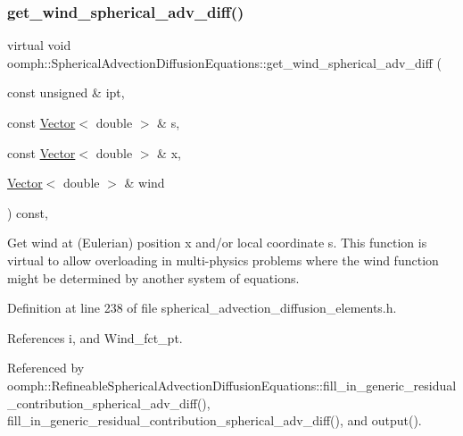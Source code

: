 \subsubsection{\texorpdfstring{get\+\_\+wind\+\_\+spherical\+\_\+adv\+\_\+diff()}{get\_wind\_spherical\_adv\_diff()}}
{\footnotesize\ttfamily virtual void oomph\+::\+Spherical\+Advection\+Diffusion\+Equations\+::get\+\_\+wind\+\_\+spherical\+\_\+adv\+\_\+diff (\begin{DoxyParamCaption}\item[{const unsigned \&}]{ipt,  }\item[{const \hyperlink{classoomph_1_1Vector}{Vector}$<$ double $>$ \&}]{s,  }\item[{const \hyperlink{classoomph_1_1Vector}{Vector}$<$ double $>$ \&}]{x,  }\item[{\hyperlink{classoomph_1_1Vector}{Vector}$<$ double $>$ \&}]{wind }\end{DoxyParamCaption}) const\hspace{0.3cm}{\ttfamily [inline]}, {\ttfamily [virtual]}}



Get wind at (Eulerian) position x and/or local coordinate s. This function is virtual to allow overloading in multi-\/physics problems where the wind function might be determined by another system of equations. 



Definition at line 238 of file spherical\+\_\+advection\+\_\+diffusion\+\_\+elements.\+h.



References i, and Wind\+\_\+fct\+\_\+pt.



Referenced by oomph\+::\+Refineable\+Spherical\+Advection\+Diffusion\+Equations\+::fill\+\_\+in\+\_\+generic\+\_\+residual\+\_\+contribution\+\_\+spherical\+\_\+adv\+\_\+diff(), fill\+\_\+in\+\_\+generic\+\_\+residual\+\_\+contribution\+\_\+spherical\+\_\+adv\+\_\+diff(), and output().

\mbox{\label{classoomph_1_1SphericalAdvectionDiffusionEquations_a25c6b912aba1088ed4759a7523a1d19a}} 
